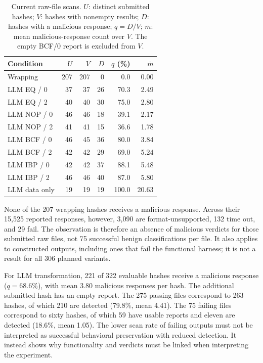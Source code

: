 \begin{table}[t]
\caption{Current raw-file scans. $U$: distinct submitted hashes; $V$:
hashes with nonempty results; $D$: hashes with a malicious response;
$q=D/V$; $\overline m$: mean malicious-response count over $V$.
The empty BCF/0 report is excluded from $V$.}
\label{tab:current_scans}
\centering\small\setlength{\tabcolsep}{5pt}
\begin{tabular}{@{}lrrrrr@{}}
\toprule
Condition & $U$ & $V$ & $D$ & $q$ (\%) & $\overline m$ \\
\midrule
Wrapping & 207 & 207 & 0 & 0.0 & 0.00 \\
LLM EQ / 0 & 37 & 37 & 26 & 70.3 & 2.49 \\
LLM EQ / 2 & 40 & 40 & 30 & 75.0 & 2.80 \\
LLM NOP / 0 & 46 & 46 & 18 & 39.1 & 2.17 \\
LLM NOP / 2 & 41 & 41 & 15 & 36.6 & 1.78 \\
LLM BCF / 0 & 46 & 45 & 36 & 80.0 & 3.84 \\
LLM BCF / 2 & 42 & 42 & 29 & 69.0 & 5.24 \\
LLM IBP / 0 & 42 & 42 & 37 & 88.1 & 5.48 \\
LLM IBP / 2 & 46 & 46 & 40 & 87.0 & 5.80 \\
LLM data only & 19 & 19 & 19 & 100.0 & 20.63 \\
\bottomrule
\end{tabular}
\end{table}



None of the 207 wrapping hashes receives a malicious response. Across
their 15,525 reported responses, however, 3,090 are format-unsupported,
132 time out, and 29 fail. The observation is therefore an absence of
malicious verdicts for those submitted raw files, not 75 successful benign
classifications per file. It also applies to constructed outputs, including
ones that fail the functional harness; it is not a result for all 306
planned variants.

For LLM transformation, 221 of 322 evaluable hashes receive a malicious
response ($q=68.6$\%), with mean 3.80 malicious responses per hash. The
additional submitted hash has an empty report. The 275 passing files
correspond to 263 hashes, of which 210 are detected (79.8\%, mean 4.41).
The 75 failing files correspond to sixty hashes, of which 59 have usable
reports and eleven are detected (18.6\%, mean 1.05). The lower scan rate
of failing outputs must not be interpreted as successful behavioral
preservation with reduced detection. It instead shows why functionality
and verdicts must be linked when interpreting the experiment.

